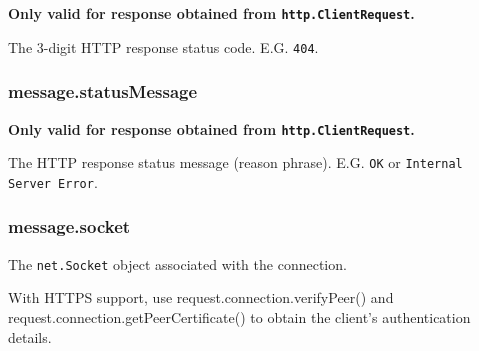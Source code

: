 \textbf{Only valid for response obtained from
\texttt{http.ClientRequest}.}

The 3-digit HTTP response status code. E.G. \texttt{404}.

\subsubsection{message.statusMessage}\label{message.statusmessage}

\textbf{Only valid for response obtained from
\texttt{http.ClientRequest}.}

The HTTP response status message (reason phrase). E.G. \texttt{OK} or
\texttt{Internal Server Error}.

\subsubsection{message.socket}\label{message.socket}

The \texttt{net.Socket} object associated with the connection.

With HTTPS support, use request.connection.verifyPeer() and
request.connection.getPeerCertificate() to obtain the client's
authentication details.
